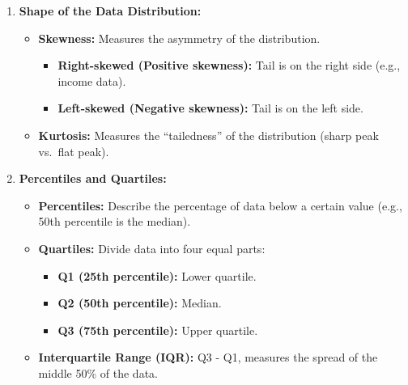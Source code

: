 \documentclass[12pt]{book}
\providecommand{\tightlist}{%
  \setlength{\itemsep}{0pt}\setlength{\parskip}{0pt}}
\begin{document}
\begin{enumerate}
  \begin{itemize}
  \tightlist
  \item
    \textbf{Range:} 4 - 1 = 3
  \item
    \textbf{Variance:} 1.3
  \item
    \textbf{Standard Deviation:} 1.14
  \end{itemize}
\item
  \textbf{Shape of the Data Distribution:}

  \begin{itemize}
  \tightlist
  \item
    \textbf{Skewness:} Measures the asymmetry of the distribution.

    \begin{itemize}
    \tightlist
    \item
      \textbf{Right-skewed (Positive skewness):} Tail is on the right
      side (e.g., income data).
    \item
      \textbf{Left-skewed (Negative skewness):} Tail is on the left
      side.
    \end{itemize}
  \item
    \textbf{Kurtosis:} Measures the ``tailedness'' of the distribution
    (sharp peak vs.~flat peak).
  \end{itemize}
\item
  \textbf{Percentiles and Quartiles:}

  \begin{itemize}
  \tightlist
  \item
    \textbf{Percentiles:} Describe the percentage of data below a
    certain value (e.g., 50th percentile is the median).
  \item
    \textbf{Quartiles:} Divide data into four equal parts:

    \begin{itemize}
    \tightlist
    \item
      \textbf{Q1 (25th percentile):} Lower quartile.
    \item
      \textbf{Q2 (50th percentile):} Median.
    \item
      \textbf{Q3 (75th percentile):} Upper quartile.
    \end{itemize}
  \item
    \textbf{Interquartile Range (IQR):} Q3 - Q1, measures the spread of
    the middle 50\% of the data.
  \end{itemize}
\end{enumerate}
\end{document}
